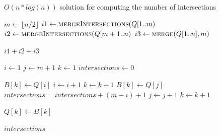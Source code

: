 \begin{algorithm}
	\caption{$O(n * log(n))$ solution for computing the number of intersections}
	\begin{algorithmic}
	
	  	\State {} 
		
		\Return {} 
	  \EndFunction
	  
	  \EndFunction
	  
		
		\EndIf
	  
	  	\State $m \gets \lfloor n/2 \rfloor$
		\State $i1 \gets \Call{mergeIntersections}{Q[1 .. m}$	
		\State $i2 \gets \Call{mergeIntersections}{Q[m + 1 .. n}$
		\State $i3 \gets \Call{merge}{Q[1 .. n], m}$ 
	 
	 	\Return $i1 + i2 + i3$
	  \EndFunction
	  
	  	\State $i \gets 1$
	  	\State $j \gets m + 1$
		\State $k \gets 1$
	  	\State $intersections \gets 0$
		
				\State $B[k] \gets Q[i]$
				\State $i \gets i + 1$ 
				\State $k \gets k + 1$
			\Else
				\State $B[k] \gets Q[j]$
				\State $intersections = intersections + (m - i) + 1$
				\State $j \gets j + 1$ 
				\State $k \gets k + 1$
			\EndIf
		
				\State $Q[k] \gets B[k]$
			\EndFor
			
			\Return $intersections$
		\EndWhile
	  
	  \EndFunction
	  
	  \end{algorithmic}
\end{algorithm}
